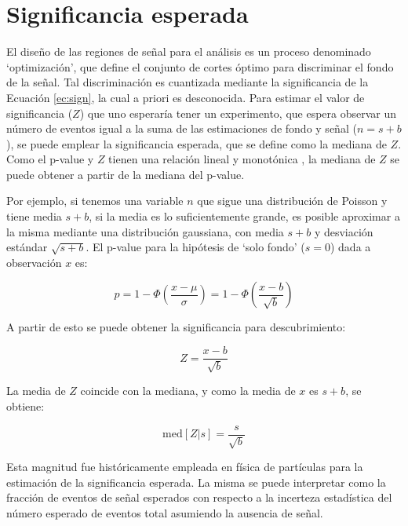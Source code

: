 \section{Significancia esperada}\label{sec:exp_sig}

El diseño de las regiones de señal para el análisis es un proceso denominado `optimización', que define el conjunto de cortes óptimo para discriminar el fondo de la señal. Tal discriminación es cuantizada mediante la significancia de la Ecuación \ref{ec:sign}, la cual a priori es desconocida. Para estimar el valor de significancia ($Z$) que uno esperaría tener un experimento, que espera observar un número de eventos igual a la suma de las estimaciones de fondo y señal ($n=s+b$), se puede emplear la significancia esperada, que se define como la mediana de $Z$. Como el p-value y $Z$ tienen una relación lineal y monotónica \cite{Cowan:2010js}, la mediana de $Z$ se puede obtener a partir de la mediana del p-value.


Por ejemplo, si tenemos una variable $n$ que sigue una distribución de Poisson y tiene media $s+b$, si la media es lo suficientemente grande, es posible aproximar a la misma mediante una distribución gaussiana, con media $s+b$ y desviación estándar $\sqrt{s+b}$. El p-value para la hipótesis de `solo fondo' ($s=0$) dada a observación $x$ es:

\begin{equation}
	p = 1 - \Phi\left( \frac{x-\mu}{\sigma} \right) = 1 - \Phi\left( \frac{x-b}{\sqrt{b}} \right)
\end{equation}

A partir de esto se puede obtener la significancia para descubrimiento:

\begin{equation}
	Z = \frac{x-b}{\sqrt{b}}
\end{equation}

La media de $Z$ coincide con la mediana, y como la media de $x$ es $s+b$, se obtiene:

\begin{equation}
	\text{med}[Z|s] = \frac{s}{\sqrt{b}}
\end{equation}

Esta magnitud fue históricamente empleada en física de partículas para la estimación de la significancia esperada. La misma se puede interpretar como la fracción de eventos de señal esperados con respecto a la incerteza estadística del número esperado de eventos total asumiendo la ausencia de señal.

